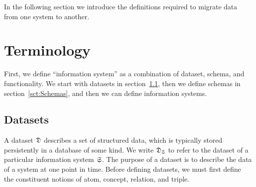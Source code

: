 \documentclass{elsarticle}
\begin{document}


   

   In the following section we introduce the definitions required to migrate data from one system to another.

\section{Terminology}
\label{sct:Terminology}
   First,
   we define ``information system'' as a combination of dataset, schema, and functionality.
   We start with datasets in section~\ref{sct:Datasets}, then we define schemas in section~\ref{sct:Schemas},
   and then we can define information systems.

\subsection{Datasets}
\label{sct:Datasets}
   A dataset $\mathfrak{D}$ describes a set of structured data, which is typically stored persistently in a database of some kind.
   We write $\mathfrak{D}_{\mathfrak{S}}$ to refer to the dataset of a particular information system $\mathfrak{S}$.
   The purpose of a dataset is to describe the data of a system at one point in time. 
   Before defining datasets, we must first define the constituent notions of atom, concept, relation, and triple.
   
\end{document}
